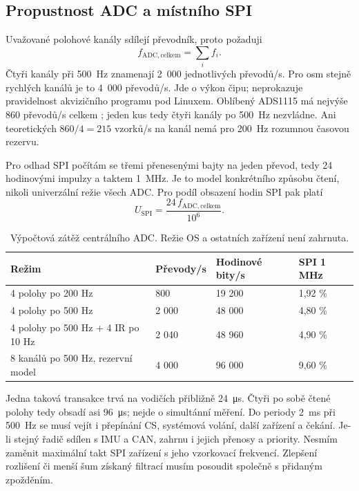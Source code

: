 \subsection{Propustnost ADC a místního SPI}

Uvažované polohové kanály sdílejí převodník, proto požaduji
\begin{equation}
 f_{\mathrm{ADC,celkem}}=\sum_i f_i.
\end{equation}
Čtyři kanály při \SI{500}{Hz} znamenají 2~000 jednotlivých převodů/s.
Pro osm stejně rychlých kanálů je to 4~000 převodů/s. Jde o výkon
čipu; neprokazuje pravidelnost akvizičního programu pod Linuxem.
Oblíbený ADS1115 má nejvýše 860 převodů/s celkem \cite{ads1115-adc};
jeden kus tedy čtyři kanály po \SI{500}{Hz} nezvládne. Ani teoretických
$860/4=215$ vzorků/s na kanál nemá pro \SI{200}{Hz} rozumnou časovou rezervu.

Pro odhad SPI počítám se třemi přenesenými bajty na jeden převod,
tedy 24 hodinovými impulzy a taktem \SI{1}{MHz}. Je to model
konkrétního způsobu čtení, nikoli univerzální režie všech ADC.
Pro podíl obsazení hodin SPI pak platí
\begin{equation}
 U_{\mathrm{SPI}}=\frac{24\,f_{\mathrm{ADC,celkem}}}{10^6}.
\end{equation}

\begin{table}[htbp]
\centering\small
\caption{Výpočtová zátěž centrálního ADC. Režie OS a ostatních zařízení není zahrnuta.}
\label{tab:adc-vypocet}
\begin{tabularx}{\textwidth}{@{}YR{26mm}R{28mm}R{20mm}@{}}
\toprule
Režim & Převody/s & Hodinové bity/s & SPI 1 MHz \\
 polohy po 200 Hz & 800 & 19 200 & 1,92 \% \\
4 polohy po 500 Hz & 2 000 & 48 000 & 4,80 \% \\
4 polohy po 500 Hz + 4 IR po 10 Hz & 2 040 & 48 960 & 4,90 \% \\
8 kanálů po 500 Hz, rezervní model & 4 000 & 96 000 & 9,60 \% \\
\bottomrule
\end{tabularx}
\end{table}

Jedna taková transakce trvá na vodičích přibližně \SI{24}{\micro\second}.
Čtyři po sobě čtené polohy tedy obsadí asi \SI{96}{\micro\second};
nejde o simultánní měření. Do periody \SI{2}{ms} při \SI{500}{Hz}
se musí vejít i přepínání CS, systémová volání, další zařízení a čekání.
Je-li stejný řadič sdílen s IMU a CAN, zahrnu i jejich přenosy a
priority. Nesmím zaměnit maximální takt SPI zařízení s jeho
vzorkovací frekvencí. Zlepšení rozlišení či menší šum získaný filtrací
musím posoudit společně s přidaným zpožděním.

